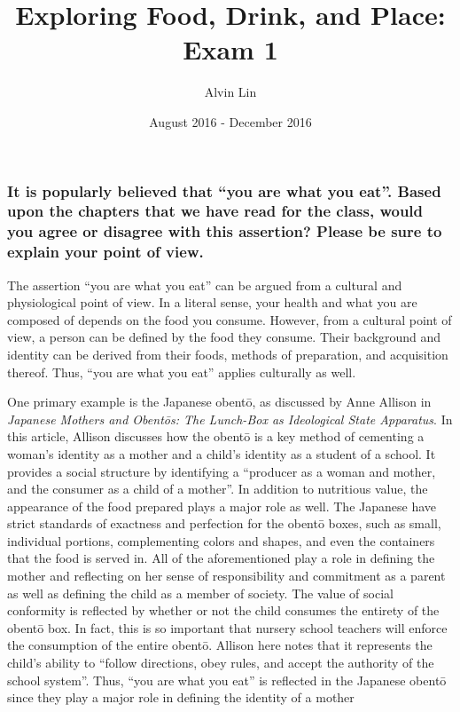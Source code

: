 \documentclass{article}
\title{Exploring Food, Drink, and Place: Exam 1}
\author{Alvin Lin}
\date{August 2016 - December 2016}
\begin{document}
\maketitle

\subsubsection*{It is popularly believed that ``you are what you eat''. Based
upon the chapters that we have read for the class, would you agree or disagree
with this assertion? Please be sure to explain your point of view.}

The assertion ``you are what you eat'' can be argued from a cultural and
physiological point of view. In a literal sense, your health and what you are
composed of depends on the food you consume. However, from a cultural point of
view, a person can be defined by the food they consume. Their background
and identity can be derived from their foods, methods of preparation, and
acquisition thereof. Thus, ``you are what you eat'' applies culturally as
well. \par
One primary example is the Japanese obent\={o}, as discussed by Anne Allison in
\textit{Japanese Mothers and Obent\={o}s: The Lunch-Box as Ideological State
Apparatus}. In this article, Allison discusses how the obent\={o} is a key
method of cementing a woman's identity as a mother and a child's identity as
a student of a school. It provides a social structure by identifying a
``producer as a woman and mother, and the consumer as a child of a mother''. In
addition to nutritious value, the appearance of the food prepared plays a major
role as well. The Japanese have strict standards of exactness and perfection
for the obent\={o} boxes, such as small, individual portions, complementing
colors and shapes, and even the containers that the food is served in. All of
the aforementioned play a role in defining the mother and reflecting on her
sense of responsibility and commitment as a parent as well as defining the
child as a member of society. The value of social conformity is reflected by
whether or not the child consumes the entirety of the obent\={o} box. In fact,
this is so important that nursery school teachers will enforce the consumption
of the entire obent\={o}. Allison here notes that it represents the child's
ability to ``follow directions, obey rules, and accept the authority of the
school system''. Thus, ``you are what you eat'' is reflected in the Japanese
obent\={o} since they play a major role in defining the identity of a mother
\end{document}
